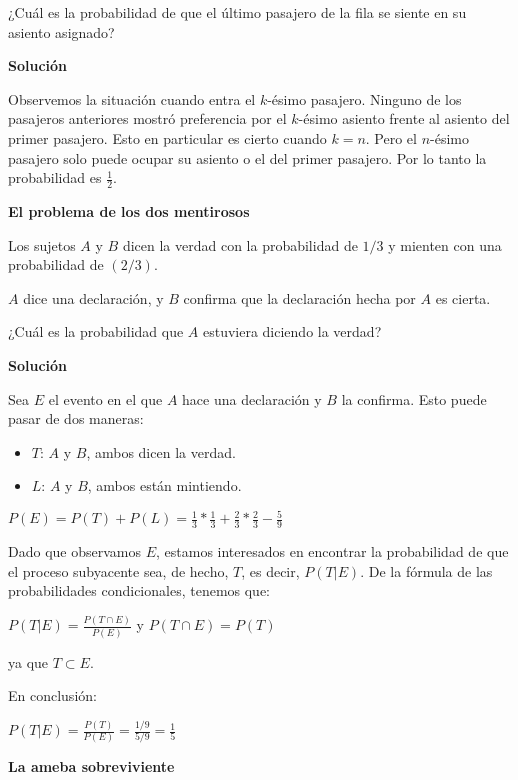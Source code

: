 ¿Cuál es la probabilidad de que el último pasajero de la fila se siente en su
asiento asignado?

\textbf{Solución}

Observemos la situación cuando entra el $k$-ésimo pasajero. Ninguno de los
pasajeros anteriores mostró preferencia por el $k$-ésimo asiento frente al
asiento del primer pasajero. Esto en particular es cierto cuando $k=n$. Pero el
$n$-ésimo pasajero solo puede ocupar su asiento o el del primer pasajero. Por lo
tanto la probabilidad es $\frac{1}{2}$.

\textbf{El problema de los dos mentirosos}

Los sujetos $A$ y $B$ dicen la verdad con la probabilidad de $1/3$ y mienten con
una probabilidad de $(2/3)$.

$A$ dice una declaración, y $B$ confirma que la declaración hecha por $A$ es
cierta.

¿Cuál es la probabilidad que $A$ estuviera diciendo la verdad?

\textbf{Solución}

Sea $E$ el evento en el que $A$ hace una declaración y $B$ la confirma. Esto
puede pasar de dos maneras:

\begin{itemize}
    \item $T$: $A$ y $B$, ambos dicen la verdad.
    \item $L$: $A$ y $B$, ambos están mintiendo.
\end{itemize}

\begin{center}
$P(E)=P(T)+P(L)=\frac{1}{3}*\frac{1}{3}+\frac{2}{3}*\frac{2}{3}-\frac{5}{9}$
\end{center}

Dado que observamos $E$, estamos interesados en encontrar la probabilidad de que
el proceso subyacente sea, de hecho, $T$, es decir, $P(T|E)$. De la fórmula de las
probabilidades condicionales, tenemos que:

\begin{center}
$P(T|E)=\frac{P(T \cap E)}{P(E)}$  y $P(T \cap E) = P(T)$
\end{center}

ya que $T \subset E$.

En conclusión:

\begin{center}
$P(T|E) = \frac{P(T)}{P(E)} = \frac{1/9}{5/9} = \frac{1}{5}$
\end{center}

\textbf{La ameba sobreviviente}

